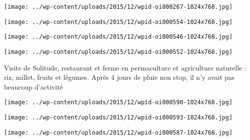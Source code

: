  

\begin{center} \texttt{[image: ../wp-content/uploads/2015/12/wpid-oi000267-1024x768.jpg]} \end{center}

 

 

\begin{center} \texttt{[image: ../wp-content/uploads/2015/12/wpid-oi000554-1024x768.jpg]} \end{center}

 

 

\begin{center} \texttt{[image: ../wp-content/uploads/2015/12/wpid-oi000546-1024x768.jpg]} \end{center}

 

 

\begin{center} \texttt{[image: ../wp-content/uploads/2015/12/wpid-oi000552-1024x768.jpg]} \end{center}

 

 Visite de Solitude, restaurant et ferme en permaculture et agriculture naturelle : riz, millet, fruits et légumes. Après 4 jours de pluie non stop, il n'y avait pas beaucoup d'activité 

 

\begin{center} \texttt{[image: ../wp-content/uploads/2015/12/wpid-oi000590-1024x768.jpg]} \end{center}

 

 

\begin{center} \texttt{[image: ../wp-content/uploads/2015/12/wpid-oi000593-1024x768.jpg]} \end{center}

 

 

\begin{center} \texttt{[image: ../wp-content/uploads/2015/12/wpid-oi000587-1024x768.jpg]} \end{center}




 
 
